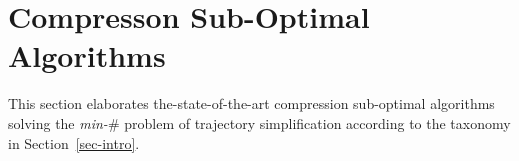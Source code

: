 
\section{Compresson Sub-Optimal Algorithms}
\label{sec-subopt}



This section elaborates the-state-of-the-art compression sub-optimal algorithms solving the \emph{min-$\#$} problem of trajectory simplification according to the taxonomy in Section~\ref{sec-intro}.









